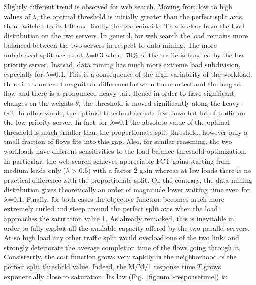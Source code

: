 Slightly different trend is observed for web search. Moving from low to high values of $\lambda$, the optimal threshold is initially greater than the perfect split axis, then switches to its left and finally the two coincide. This is clear from the load distribution on the two servers. In general, for web search the load remains more balanced between the two servers in respect to data mining. The more unbalanced split occurs at $\lambda$=0.3 where 70\% of the traffic is handled by the low priority server. Instead, data mining has much more extreme load subdivision, especially for $\lambda$=0.1. This is a consequence of the high variability of the workload: there is six order of magnitude difference between the shortest and the longest flow and there is a pronounced heavy-tail. Hence in order to have significant changes on the weights $\theta_i$ the threshold is moved significantly along the heavy-tail. In other words, the optimal threshold reroute few flows but lot of traffic on the low priority server. In fact, for $\lambda$=0.1 the absolute value of the optimal threshold is much smaller than the proportionate split threshold, however only a small fraction of flows fits into this gap. Also, for similar reasoning, the two workloads have different sensitivities to the load balance threshold optimization. In particular, the web search achieves appreciable FCT gains starting from medium loads only ($\lambda > 0.5$) with a factor 2 gain%
whereas at low loads there is no practical difference with the proportionate split. On the contrary, the data mining distribution gives theoretically an order of magnitude %
lower waiting time even for $\lambda$=0.1. %
Finally, for both cases the objective function becomes much more extremely curled and steep around the perfect split axis when the load approaches the saturation value 1.  As already remarked, this is inevitable in order to fully exploit all the available capacity offered by the two parallel servers. At so high load any other traffic split would overload one of the two links and strongly deteriorate the average completion time of the flows going through it. Consistently, the cost function grows very rapidly in the neighborhood of the perfect split threshold value. Indeed, the M/M/1 response time $T$ grows exponentially close to saturation. Its law (Fig.~\ref{fig:mm1-responsetime}) is:
